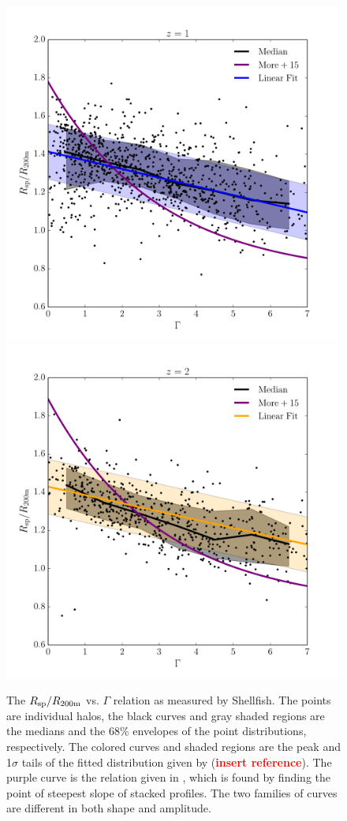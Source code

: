 \documentclass[numberedappendix,apj]{emulateapj}
\begin{document}
\begin{figure}
   \includegraphics[width=\columnwidth]{z1_fit.pdf}
   \includegraphics[width=\columnwidth]{z2_fit.pdf}
   \caption{The $R_{\rm sp}/R_{\rm 200m}$ vs. $\Gamma$ relation as measured
        by Shellfish. The points are individual halos, the black curves and gray
        shaded regions are the medians and the 68\% envelopes of the point
        distributions, respectively. The colored curves and shaded regions are
        the peak and 1$\sigma$ tails of the fitted distribution given by
        (\textcolor{red}{\textbf{insert reference}}). The purple curve is the
        relation given in \citet{more_et_al_2015}, which is found by finding the
        point of steepest slope of stacked profiles. The two families of curves
        are different in both shape and amplitude.}
        \label{fig:z_fit}
\end{figure}
\end{document}

